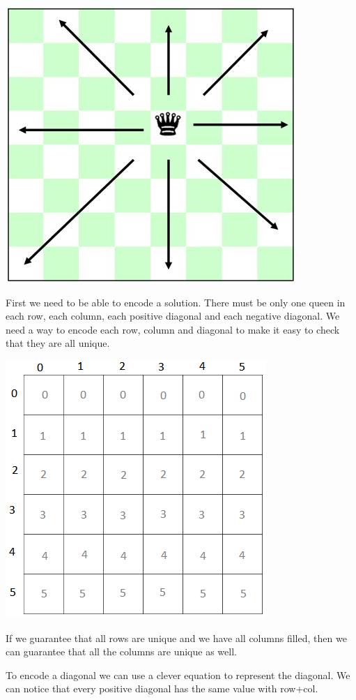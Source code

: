 \documentclass[11pt,oneside]{book}
\makeatletter
\def\maxwidth#1{\ifdim\Gin@nat@width>#1 #1\else\Gin@nat@width\fi}
\makeatother
\begin{document}
\includegraphics[width=\maxwidth{\textwidth}]{nqueen.jpg}

First we need to be able to encode a solution. There must be only one queen in each row, each column, each positive diagonal and each negative diagonal. We need a way to encode each row, column and diagonal to make it easy to check that they are all unique.

\includegraphics[width=\maxwidth{\textwidth}]{nqueen3.png}

If we guarantee that all rows are unique and we have all columns filled, then we can guarantee that all the columns are unique as well.

To encode a diagonal we can use a clever equation to represent the diagonal. We can notice that every positive diagonal has the same value with row+col.
\end{document}
